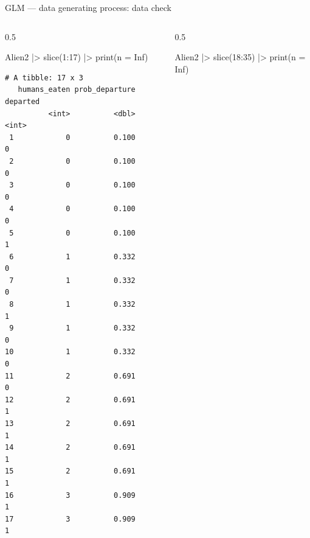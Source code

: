 \documentclass[
  10pt,
  ignorenonframetext,
  aspectratio=169,
  t]{beamer}
\newenvironment{Shaded}{\begin{snugshade}}{\end{snugshade}}
\newcommand{\AttributeTok}[1]{\textcolor[rgb]{0.40,0.45,0.13}{#1}}
\newcommand{\ConstantTok}[1]{\textcolor[rgb]{0.56,0.35,0.01}{#1}}
\newcommand{\DecValTok}[1]{\textcolor[rgb]{0.68,0.00,0.00}{#1}}
\newcommand{\FunctionTok}[1]{\textcolor[rgb]{0.28,0.35,0.67}{#1}}
\newcommand{\NormalTok}[1]{\textcolor[rgb]{0.00,0.23,0.31}{#1}}
\newcommand{\SpecialCharTok}[1]{\textcolor[rgb]{0.37,0.37,0.37}{#1}}
\begin{document}
\begin{frame}[fragile]{GLM --- data generating process: data check}
\protect{}\label{glm-data-generating-process-data-check}
\begin{columns}[T]
\begin{column}{0.5\linewidth}
\footnotesize

\begin{Shaded}
\begin{Highlighting}[]
\NormalTok{Alien2 }\SpecialCharTok{|\textgreater{}} \FunctionTok{slice}\NormalTok{(}\DecValTok{1}\SpecialCharTok{:}\DecValTok{17}\NormalTok{) }\SpecialCharTok{|\textgreater{}} \FunctionTok{print}\NormalTok{(}\AttributeTok{n =} \ConstantTok{Inf}\NormalTok{)}
\end{Highlighting}
\end{Shaded}

\begin{verbatim}
# A tibble: 17 x 3
   humans_eaten prob_departure departed
          <int>          <dbl>    <int>
 1            0          0.100        0
 2            0          0.100        0
 3            0          0.100        0
 4            0          0.100        0
 5            0          0.100        1
 6            1          0.332        0
 7            1          0.332        0
 8            1          0.332        1
 9            1          0.332        0
10            1          0.332        0
11            2          0.691        0
12            2          0.691        1
13            2          0.691        1
14            2          0.691        1
15            2          0.691        1
16            3          0.909        1
17            3          0.909        1
\end{verbatim}

\normalsize
\end{column}

\begin{column}{0.5\linewidth}
\footnotesize

\begin{Shaded}
\begin{Highlighting}[]
\NormalTok{Alien2 }\SpecialCharTok{|\textgreater{}} \FunctionTok{slice}\NormalTok{(}\DecValTok{18}\SpecialCharTok{:}\DecValTok{35}\NormalTok{) }\SpecialCharTok{|\textgreater{}} \FunctionTok{print}\NormalTok{(}\AttributeTok{n =} \ConstantTok{Inf}\NormalTok{)}
\end{Highlighting}
\end{Shaded}


\end{column}
\end{columns}
\end{frame}
\end{document}
